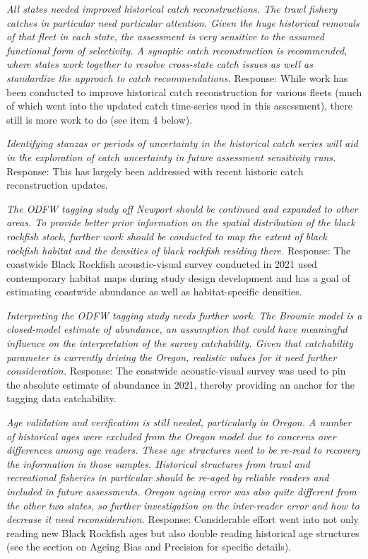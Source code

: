 \documentclass[11pt,
  english,
  letterpaper,
]{article}
\begin{document}
\textit{All states needed improved historical catch reconstructions. The trawl fishery catches in particular need particular attention. Given the huge historical removals of that fleet in each state, the assessment is very sensitive to the assumed functional form of selectivity. A synoptic catch reconstruction is recommended, where states work together to resolve cross-state catch issues as well as standardize the approach to catch recommendations.} Response: While work has been conducted to improve historical catch reconstruction for various fleets (much of which went into the updated catch time-series used in this assessment), there still is more work to do (see item 4 below).

\textit{Identifying stanzas or periods of uncertainty in the historical catch series will aid in the exploration of catch uncertainty in future assessment sensitivity runs.} Response: This has largely been addressed with recent historic catch reconstruction updates.

\textit{The ODFW tagging study off Newport should be continued and expanded to other areas. To provide better prior information on the spatial distribution of the black rockfish stock, further work should be conducted to map the extent of black rockfish habitat and the densities of black rockfish residing there.} Response: The coastwide Black Rockfish acoustic-visual survey conducted in 2021 used contemporary habitat maps during study design development and has a goal of estimating coastwide abundance as well as habitat-specific densities.

\textit{Interpreting the ODFW tagging study needs further work. The Brownie model is a closed-model estimate of abundance, an assumption that could have meaningful influence on the interpretation of the survey catchability. Given that catchability parameter is currently driving the Oregon, realistic values for it need further consideration.} Response: The coastwide acoustic-visual survey was used to pin the absolute estimate of abundance in 2021, thereby providing an anchor for the tagging data catchability.

\textit{Age validation and verification is still needed, particularly in Oregon. A number of historical ages were excluded from the Oregon model due to concerns over differences among age readers. These age structures need to be re-read to recovery the information in those samples. Historical structures from trawl and recreational fisheries in particular should be re-aged by reliable readers and included in future assessments. Oregon ageing error was also quite different from the other two states, so further investigation on the inter-reader error and how to decrease it need reconsideration.} Response: Considerable effort went into not only reading new Black Rockfish ages but also double reading historical age structures (see the section on Ageing Bias and Precision for specific details).
\end{document}
